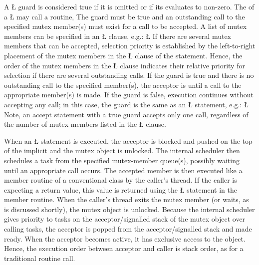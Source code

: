 \documentclass[openright,twoside]{report}
\begin{document}
A \LGinlinetrue\LGbegin\lgrinde\L{}\endlgrinde\LGend{} guard is considered true if it is omitted or if its  evaluates to non-zero.
The  of a \LGinlinetrue\LGbegin\lgrinde\L{}\endlgrinde\LGend{} may call a routine, 
The guard must be true and an outstanding call to the specified mutex member(s) must exist for a call to be accepted.
A list of mutex members can be specified in an \LGinlinetrue\LGbegin\lgrinde\L{}\endlgrinde\LGend{} clause, e.g.:
\LGinlinefalse\LGbegin\lgrinde
\L{}
\CE{}\endlgrinde\LGend
If there are several mutex members that can be accepted, selection priority is established by the left-to-right placement of the mutex members in the \LGinlinetrue\LGbegin\lgrinde\L{}\endlgrinde\LGend{} clause of the statement.
Hence, the order of the mutex members in the \LGinlinetrue\LGbegin\lgrinde\L{}\endlgrinde\LGend{} clause indicates their relative priority for selection if there are several outstanding calls.
If the guard is true and there is no outstanding call to the specified member(s), the acceptor is  until a call to the appropriate member(s) is made.
If the guard is false, execution continues without accepting any call;
in this case, the guard is the same as an \LGinlinetrue\LGbegin\lgrinde\L{}\endlgrinde\LGend{} statement, e.g.:
\LGinlinefalse\LGbegin\lgrinde
\L{}
\endlgrinde\LGend
Note, an accept statement with a true guard accepts only one call, regardless of the number of mutex members listed in the \LGinlinetrue\LGbegin\lgrinde\L{}\endlgrinde\LGend{} clause.

When an \LGinlinetrue\LGbegin\lgrinde\L{}\endlgrinde\LGend{} statement is executed, the acceptor is blocked and pushed on the top of the implicit  and the mutex object is unlocked.
The internal scheduler then schedules a task from the specified mutex-member queue(s), possibly waiting until an appropriate call occurs.
The accepted member is then executed like a member routine of a conventional class by the caller's thread.
If the caller is expecting a return value, this value is returned using the \LGinlinetrue\LGbegin\lgrinde\L{}\endlgrinde\LGend{} statement in the member routine.
When the caller's thread exits the mutex member (or waits, as is discussed shortly), the mutex object is unlocked.
Because the internal scheduler gives priority to tasks on the acceptor/signalled stack of the mutex object over calling tasks, the acceptor is popped from the acceptor/signalled stack and made ready.
When the acceptor becomes active, it has exclusive access to the object.
Hence, the execution order between acceptor and caller is stack order, as for a traditional routine call.
\end{document}
